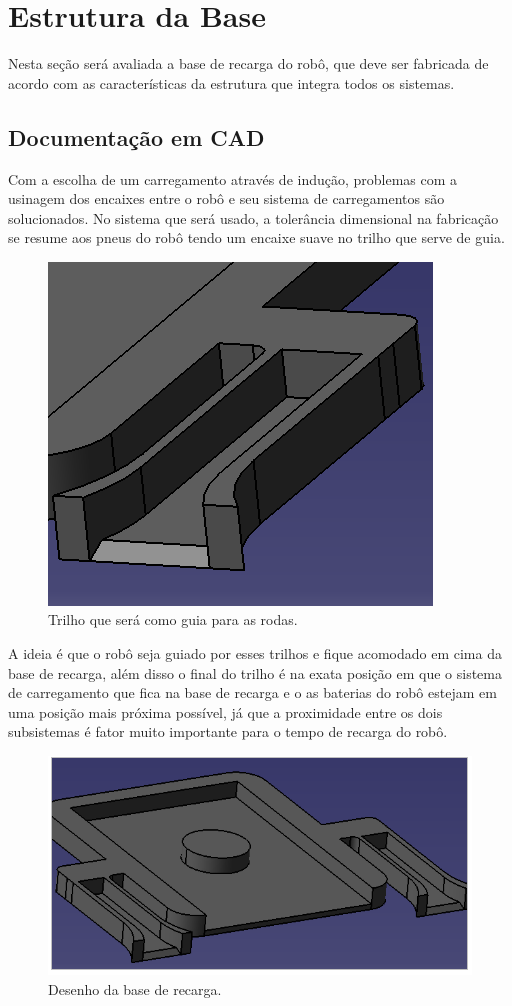 \section{Estrutura da Base}

Nesta seção será avaliada a base de recarga do robô, que deve ser fabricada de acordo com as características da estrutura que integra todos os sistemas.

\subsection{Documentação em CAD}
Com a escolha de um carregamento através de indução, problemas com a usinagem dos encaixes entre o robô e seu sistema de carregamentos são solucionados. No sistema que será usado, a tolerância dimensional na fabricação se resume aos pneus do robô tendo um encaixe suave no trilho que serve de guia.

\begin{figure}[H]
	\centering
	\includegraphics[scale=0.7]{figuras/trilho_base.png}
	\caption{Trilho que será como guia para as rodas.}
	\label{img:trilho_base}
\end{figure}

A ideia é que o robô seja guiado por esses trilhos e fique acomodado em cima da base de recarga, além disso o final do trilho é na exata posição em que o sistema de carregamento que fica na base de recarga e o as baterias do robô estejam em uma posição mais próxima possível, já que a proximidade entre os dois subsistemas é fator muito importante para o tempo de recarga do robô.

\begin{figure}[H]
	\centering
	\includegraphics[scale=0.7]{figuras/desenho_base_recarga.png}
	\caption{Desenho da base de recarga.}
	\label{img:desenho_base_recarga}
\end{figure}
